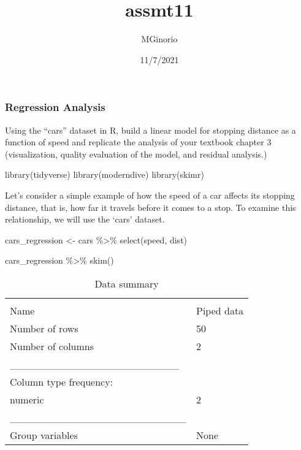 \documentclass[
]{article}
\title{assmt11}
\author{MGinorio}
\date{11/7/2021}
\newenvironment{Shaded}{\begin{snugshade}}{\end{snugshade}}
\newcommand{\FunctionTok}[1]{\textcolor[rgb]{0.00,0.00,0.00}{#1}}
\newcommand{\NormalTok}[1]{#1}
\newcommand{\OtherTok}[1]{\textcolor[rgb]{0.56,0.35,0.01}{#1}}
\newcommand{\SpecialCharTok}[1]{\textcolor[rgb]{0.00,0.00,0.00}{#1}}
\begin{document}
\maketitle

\hypertarget{regression-analysis}{%
\subsubsection{Regression Analysis}\label{regression-analysis}}

Using the ``cars'' dataset in R, build a linear model for stopping
distance as a function of speed and replicate the analysis of your
textbook chapter 3 (visualization, quality evaluation of the model, and
residual analysis.)

\begin{Shaded}
\begin{Highlighting}[]
\FunctionTok{library}\NormalTok{(tidyverse)}
\FunctionTok{library}\NormalTok{(moderndive)}
\FunctionTok{library}\NormalTok{(skimr)}
\end{Highlighting}
\end{Shaded}

Let's consider a simple example of how the speed of a car affects its
stopping distance, that is, how far it travels before it comes to a
stop. To examine this relationship, we will use the `cars' dataset.

\begin{Shaded}
\begin{Highlighting}[]
\NormalTok{cars\_regression }\OtherTok{\textless{}{-}}\NormalTok{ cars }\SpecialCharTok{\%\textgreater{}\%} 
  \FunctionTok{select}\NormalTok{(speed, dist)}

\NormalTok{cars\_regression }\SpecialCharTok{\%\textgreater{}\%} \FunctionTok{skim}\NormalTok{()}
\end{Highlighting}
\end{Shaded}

\begin{longtable}[]{@{}ll@{}}
\caption{Data summary}\tabularnewline
\toprule
& \\
\midrule
\endfirsthead
\toprule
& \\
\midrule
\endhead
Name & Piped data \\
Number of rows & 50 \\
Number of columns & 2 \\
\_\_\_\_\_\_\_\_\_\_\_\_\_\_\_\_\_\_\_\_\_\_\_ & \\
Column type frequency: & \\
numeric & 2 \\
\_\_\_\_\_\_\_\_\_\_\_\_\_\_\_\_\_\_\_\_\_\_\_\_ & \\
Group variables & None \\
\bottomrule
\end{longtable}
\end{document}
